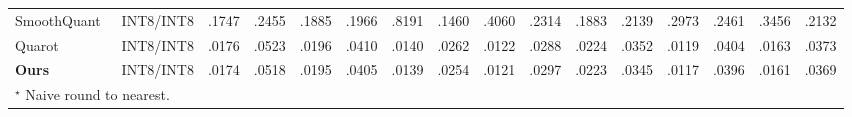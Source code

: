\begin{table}[t]
{\begin{tabular}{lccccccccccccccc}
SmoothQuant~\cite{xiao2022smoothquant}   & INT8/INT8 
& .1747 & .2455 %
& .1885 & .1966 %
& .8191 & .1460 %
& .4060 & .2314 %
& .1883 & .2139  %
& .2973  & .2461 %
& .3456 & .2132 \\%
Quarot~\cite{ashkboos2024quarot}   & INT8/INT8 
& .0176 & .0523 %
& .0196 & .0410 %
& .0140 & .0262 %
& .0122 & .0288 %
& .0224 & .0352  %
& .0119  & .0404 %
& .0163 & .0373 \\%
\midrule
\rowcolor{ourgray}
\textbf{Ours}                           & INT8/INT8
& .0174 & .0518 %
& .0195 & .0405 %
& .0139 & .0254 %
& .0121 & .0297 %
& .0223 & .0345  %
& .0117  & .0396 %
& .0161 & .0369 \\%
\bottomrule
\multicolumn{15}{l}{
$^\star$ Naive round to nearest.} \\
\end{tabular}
}
\label{tab:quantmacvo:KITTI}
\end{table}
